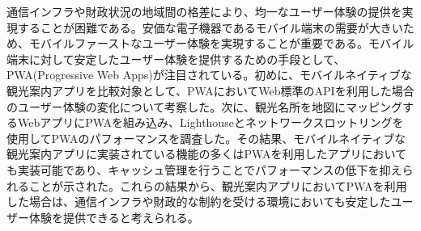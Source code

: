 通信インフラや財政状況の地域間の格差により、均一なユーザー体験の提供を実現することが困難である。安価な電子機器であるモバイル端末の需要が大きいため、モバイルファーストなユーザー体験を実現することが重要である。モバイル端末に対して安定したユーザー体験を提供するための手段として、PWA(Progressive Web Apps)が注目されている。初めに、モバイルネイティブな観光案内アプリを比較対象として、PWAにおいてWeb標準のAPIを利用した場合のユーザー体験の変化について考察した。次に、観光名所を地図にマッピングするWebアプリにPWAを組み込み、Lighthouseとネットワークスロットリングを使用してPWAのパフォーマンスを調査した。その結果、モバイルネイティブな観光案内アプリに実装されている機能の多くはPWAを利用したアプリにおいても実装可能であり、キャッシュ管理を行うことでパフォーマンスの低下を抑えられることが示された。これらの結果から、観光案内アプリにおいてPWAを利用した場合は、通信インフラや財政的な制約を受ける環境においても安定したユーザー体験を提供できると考えられる。